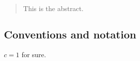 \documentclass[main.tex]{subfiles}
\begin{document}
\begin{abstract}
This is the abstract.   
\end{abstract}

\subsection*{Conventions and notation}

\(c=1\) for sure.
\end{document}
